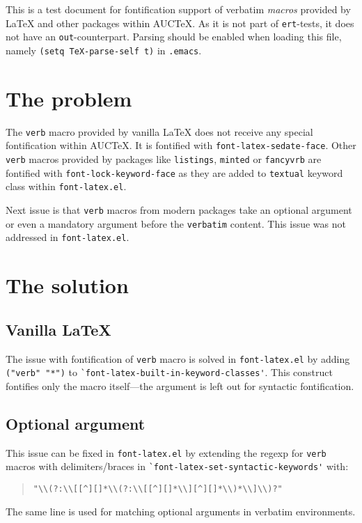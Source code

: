 \documentclass[a4paper]{article}
\begin{document}
This is a test document for fontification support of verbatim
\emph{macros} provided by \LaTeX{} and other packages within AUC\TeX.
As it is not part of \verb|ert|-tests, it does not have an
\verb|out|-counterpart.  Parsing should be enabled when loading this
file, namely \verb|(setq TeX-parse-self t)| in \verb|.emacs|.

\section{The problem}

The \verb|verb| macro provided by vanilla \LaTeX{} does not receive
any special fontification within AUC\TeX.  It is fontified with
\verb|font-latex-sedate-face|.  Other \verb|verb| macros provided by
packages like \verb|listings|, \verb|minted| or \verb|fancyvrb| are
fontified with \verb|font-lock-keyword-face| as they are added to
\verb|textual| keyword class within \verb|font-latex.el|.

Next issue is that \verb|verb| macros from modern packages take an
optional argument or even a mandatory argument before the
\verb|verbatim| content.  This issue was not addressed in
\verb|font-latex.el|.

\section{The solution}

\subsection{Vanilla \LaTeX}

The issue with fontification of \verb|verb| macro is solved in
\verb|font-latex.el| by adding \verb|("verb" "*")| to
\verb|`font-latex-built-in-keyword-classes'|.  This construct
fontifies only the macro itself---the argument is left out for
syntactic fontification.

\subsection{Optional argument}

This issue can be fixed in \verb|font-latex.el| by extending the
regexp for \verb|verb| macros with delimiters/braces in
\verb|`font-latex-set-syntactic-keywords'| with:
\begin{quote}
  \verb|"\\(?:\\[[^][]*\\(?:\\[[^][]*\\][^][]*\\)*\\]\\)?"|
\end{quote}
The same line is used for matching optional arguments in verbatim
environments.
\end{document}
